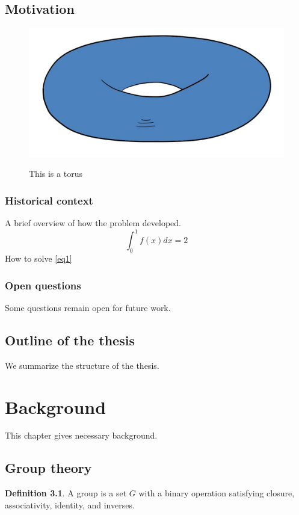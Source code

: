 \documentclass[12pt,reqno]{amsbook}
\theoremstyle{definition}
\newtheorem{definition}[theorem]{Definition}
\begin{document}
\section{Motivation}
\begin{figure}\label{fig1}
\includegraphics[alt="Description of Image that serves the same purpose",scale=0.3]{torus.jpg}
\caption{This is a torus}
\end{figure}


\subsection{Historical context}
A brief overview of how the problem developed.
\begin{equation}\label{eq1}\int_0^1 f(x) dx = 2\end{equation}
How to solve \eqref{eq1}
\subsection{Open questions}
Some questions remain open for future work.

\section{Outline of the thesis}
We summarize the structure of the thesis.

\chapter{Background}
This chapter gives necessary background.

\section{Group theory}
\begin{definition}
A group is a set $G$ with a binary operation satisfying closure, associativity, identity, and inverses.
\end{definition}
\end{document}
